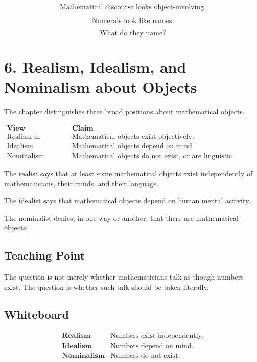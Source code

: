 \documentclass[11pt]{article}
\begin{document}
\[
\text{Mathematical discourse looks object-involving.}
\]

\[
\text{Numerals look like names.}
\]

\[
\text{What do they name?}
\]

\section*{6. Realism, Idealism, and Nominalism about Objects}

The chapter distinguishes three broad positions about mathematical objects.

\[
\begin{array}{c|c}
\textbf{View} & \textbf{Claim} \\
\hline
\text{Realism in ontology} &
\text{Mathematical objects exist objectively.} \\
\text{Idealism} &
\text{Mathematical objects depend on mind.} \\
\text{Nominalism} &
\text{Mathematical objects do not exist, or are linguistic constructions.}
\end{array}
\]

The realist says that at least some mathematical objects exist independently of
mathematicians, their minds, and their language.

The idealist says that mathematical objects depend on human mental activity.

The nominalist denies, in one way or another, that there are mathematical objects.

\subsection*{Teaching Point}

The question is not merely whether mathematicians talk as though numbers exist. The
question is whether such talk should be taken literally.

\subsection*{Whiteboard}

\[
\begin{array}{c|c}
\textbf{Realism} & \text{Numbers exist independently.} \\
\textbf{Idealism} & \text{Numbers depend on mind.} \\
\textbf{Nominalism} & \text{Numbers do not exist.}
\end{array}
\]
\end{document}
